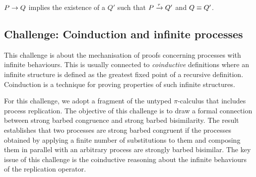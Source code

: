 \documentclass[runningheads]{llncs}
\begin{document}
\begin{theorem}\label{thm:harmony-2}
  \( P \rightarrow Q \) implies the existence of a \( Q' \) such that \( P \xrightarrow{\tau} Q' \) and \( Q \equiv Q' \).
\end{theorem}

\subsection{Challenge: Coinduction and infinite processes}
\label{sec:challenge:coinduction}
This challenge is about the mechanisation of proofs concerning processes with infinite behaviours.
%
This is usually connected to \emph{coinductive} definitions where an infinite
structure is defined as the greatest fixed point of a recursive
definition.
%
Coinduction is a technique for proving properties of
such infinite structures.
%
%
%

For this challenge, we adopt a fragment of the untyped $\pi$-calculus
that includes process replication.
The objective of this challenge is to %
draw a formal connection between strong barbed congruence and strong
barbed bisimilarity.  %
The result establishes that two processes are strong barbed congruent
if the processes obtained by applying a finite number of substitutions to
them and composing them in parallel with an arbitrary process are
strongly barbed bisimilar.
The key issue of this challenge is the coinductive reasoning about the infinite behaviours of the replication operator.
\end{document}
